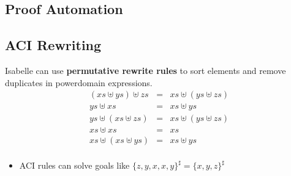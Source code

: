 \documentclass[portrait]{sciposter}
\begin{document}
\begin{multicols}{3}
\section{Proof Automation}

\subsection*{ACI Rewriting}
Isabelle can use \textbf{permutative rewrite rules} to sort elements and remove duplicates in powerdomain expressions.
\begin{displaymath}
\begin{array}{rcl}
(xs\uplus ys)\uplus zs & = & xs\uplus(ys\uplus zs) \\
ys\uplus xs & = & xs\uplus ys \\
ys\uplus(xs\uplus zs) & = & xs\uplus(ys\uplus zs) \\
xs\uplus xs & = & xs \\
xs\uplus(xs\uplus ys) & = & xs\uplus ys \\
\end{array}
\end{displaymath}

\begin{itemize}
\item ACI rules can solve goals like $\{z,y,x,x,y\}^\sharp = \{x,y,z\}^\sharp$
\end{itemize}


\end{multicols}
\end{document}
